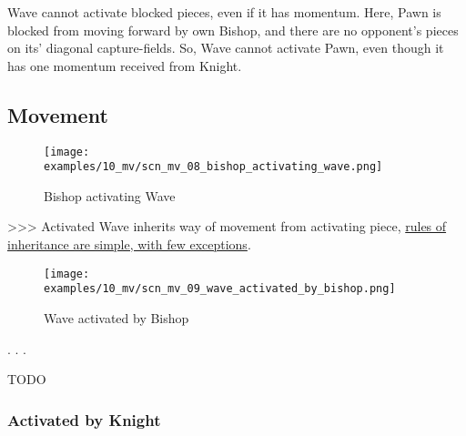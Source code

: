Wave cannot activate blocked pieces, even if it has momentum. Here, Pawn is blocked
from moving forward by own Bishop, and there are no opponent's pieces on its'
diagonal capture-fields. So, Wave cannot activate Pawn, even though it has one
momentum received from Knight.

\clearpage %

\subsection*{Movement}

\vspace*{-1.4\baselineskip}
\noindent
\begin{figure}[h]
\texttt{[image: examples/10\_mv/scn\_mv\_08\_bishop\_activating\_wave.png]}
\caption{Bishop activating Wave}
\label{fig:scn_mv_08_bishop_activating_wave}
\end{figure}

\textgreater \textgreater \textgreater
Activated Wave inherits way of movement from activating piece,
\hyperref[sec:Appendix/Movement of Wave]{rules of inheritance are simple, with few exceptions}.

\clearpage %

\vspace*{-2.1\baselineskip}
\noindent
\begin{figure}[!h]
\texttt{[image: examples/10\_mv/scn\_mv\_09\_wave\_activated\_by\_bishop.png]}
\caption{Wave activated by Bishop}
\label{fig:scn_mv_09_wave_activated_by_bishop}
\end{figure}

. . .

\huge
TODO
\normalsize

\clearpage %

\subsubsection*{Activated by Knight}

